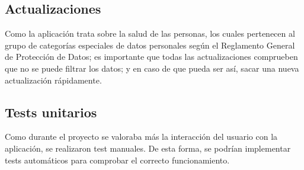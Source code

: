 \subsection{Actualizaciones}

Como la aplicación trata sobre la salud de las personas, los cuales pertenecen al grupo de categorías especiales de datos personales según el Reglamento General de Protección de Datos; es importante que todas las actualizaciones comprueben que no se puede filtrar los datos; y en caso de que pueda ser así, sacar una nueva actualización rápidamente.

\subsection{Tests unitarios}

Como durante el proyecto se valoraba más la interacción del usuario con la aplicación, se realizaron test manuales. De esta forma, se podrían implementar tests automáticos para comprobar el correcto funcionamiento.